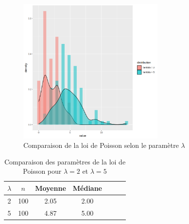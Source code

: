       \begin{table}[H]
        \centering
        \begin{minipage}{0.45\textwidth}

          \begin{figure}[H]
            \centering
            \includegraphics[width=0.65\textwidth]{4_attachments/figures/output7.png}
            \caption{Comparaison de la loi de Poisson selon le paramètre $\lambda$}
            \label{fig:poisson_lambda}
          \end{figure}
        \end{minipage}
        \hfill
        \begin{minipage}{0.45\textwidth}
          \centering
          \begin{table}[H]
            \centering
            \begin{tabular}{c c c c c c c}
              \toprule
              $\lambda$ & $n$ & Moyenne & Médiane \\
              \midrule
              2 & 100 & 2.05 & 2.00 \\
              5 & 100 & 4.87 & 5.00 \\
              \bottomrule
            \end{tabular}
            \caption{Comparaison des paramètres de la loi de Poisson pour $\lambda=2$ et $\lambda=5$}
            \label{tab:poisson_lambda}
          \end{table}
        \end{minipage}
      \end{table}